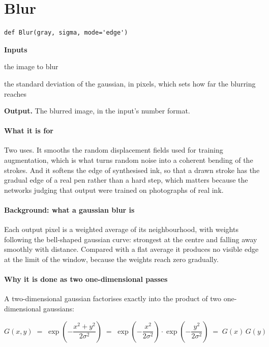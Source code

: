 \section{Blur}
\begin{lstlisting}[style=sig]
def Blur(gray, sigma, mode='edge')
\end{lstlisting}

\noindent\textbf{Inputs}
\begin{description}[leftmargin=2.2em,style=nextline,font=\normalfont\ttfamily]\setlength\itemsep{1pt}
  \item[{img}] \normalfont the image to blur
  \item[{sigma}] \normalfont the standard deviation of the gaussian, in pixels, which sets how far the blurring reaches
\end{description}

\noindent\textbf{Output.} The blurred image, in the input's number format.


\paragraph{What it is for}
Two uses. It smooths the random displacement fields used for training augmentation, which is what turns random noise into a coherent bending of the strokes. And it softens the edge of synthesised ink, so that a drawn stroke has the gradual edge of a real pen rather than a hard step, which matters because the networks judging that output were trained on photographs of real ink.


\paragraph{Background: what a gaussian blur is}
Each output pixel is a weighted average of its neighbourhood, with weights following the bell-shaped gaussian curve: strongest at the centre and falling away smoothly with distance. Compared with a flat average it produces no visible edge at the limit of the window, because the weights reach zero gradually.


\paragraph{Why it is done as two one-dimensional passes}
A two-dimensional gaussian factorises exactly into the product of two one-dimensional gaussians:


\begin{equation}
G(x,y) \;=\; \exp\!\left(-\frac{x^2 + y^2}{2\sigma^2}\right) \;=\; \exp\!\left(-\frac{x^2}{2\sigma^2}\right)\cdot\exp\!\left(-\frac{y^2}{2\sigma^2}\right) \;=\; G(x)\,G(y)
\end{equation}


